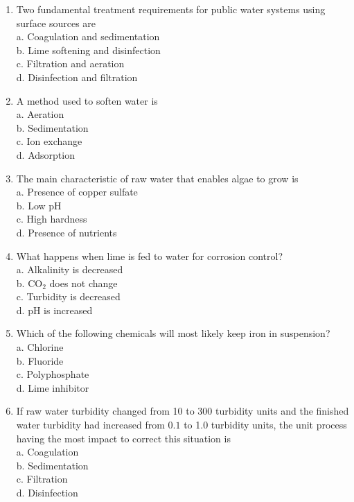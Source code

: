 \begin{enumerate}
\item Two fundamental treatment requirements for public water systems using surface sources are\\

a. Coagulation and sedimentation\\

b. Lime softening and disinfection\\

c. Filtration and aeration\\

d.  Disinfection and filtration\\


\item A method used to soften water is\\
a. Aeration\\
b. Sedimentation\\
c. Ion exchange\\
d. Adsorption\\

\item The main characteristic of raw water that enables algae to grow is\\
a. Presence of copper sulfate\\
b. Low pH\\
c. High hardness\\
d. Presence of nutrients\\

\item What happens when lime is fed to water for corrosion control?\\
a. Alkalinity is decreased\\
b. $\mathrm{CO}_{2}$ does not change\\
c. Turbidity is decreased\\
d. $\mathrm{pH}$ is increased\\

\item Which of the following chemicals will most likely keep iron in suspension?\\
a. Chlorine\\
b. Fluoride\\
c. Polyphosphate\\
d. Lime inhibitor

\item If raw water turbidity changed from 10 to 300 turbidity units and the finished water turbidity had increased from $0.1$ to 1.0 turbidity units, the unit process having the most impact to correct this situation is\\
a. Coagulation\\
b. Sedimentation\\
c. Filtration\\
d. Disinfection


\end{enumerate}
